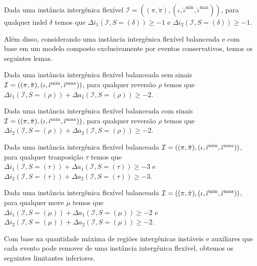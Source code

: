 \begin{lemma}\label{lemma:HQJMMZCU}
Dada uma instância intergênica flexível $\mathcal{I} = ((\pi,\breve\pi),(\iota,\breve\iota^{\min},\breve\iota^{\max}))$, para qualquer indel $\delta$ temos que $\Delta i_1(\mathcal{I}, S = (\delta)) \ge -1$ e $\Delta i_2(\mathcal{I}, S = (\delta)) \ge -1$.
\end{lemma}

Além disso, considerando uma instância intergênica flexível balanceada e com base em um modelo composto exclusivamente por eventos conservativos, temos os seguintes lemas.

\begin{lemma}\label{lemma:IERALSKC}
Dada uma instância intergênica flexível balanceada sem sinais $\mathcal{I} = ((\pi,\breve\pi),\break(\iota,\breve\iota^{\min},\breve\iota^{\max}))$, para qualquer reversão $\rho$ temos que $\Delta i_1(\mathcal{I}, S = (\rho)) + \Delta a_1(\mathcal{I}, S = (\rho)) \ge -2$.
\end{lemma}

\begin{lemma}\label{lemma:LMCJCLQU}
Dada uma instância intergênica flexível balanceada com sinais $\mathcal{I} = ((\pi,\breve\pi),\break(\iota,\breve\iota^{\min},\breve\iota^{\max}))$, para qualquer reversão $\rho$ temos que $\Delta i_2(\mathcal{I}, S = (\rho)) + \Delta a_2(\mathcal{I}, S = (\rho)) \ge -2$.
\end{lemma}

\begin{lemma}\label{lemma:FOXQSODF}
Dada uma instância intergênica flexível balanceada $\mathcal{I} = ((\pi,\breve\pi),\break(\iota,\breve\iota^{\min},\breve\iota^{\max}))$, para qualquer tranposição $\tau$ temos que $\Delta i_1(\mathcal{I}, S = (\tau)) + \Delta a_1(\mathcal{I}, S = (\tau)) \ge -3$ e $\Delta i_2(\mathcal{I}, S = (\tau)) + \Delta a_2(\mathcal{I}, S = (\tau)) \ge -3$.
\end{lemma}

\begin{lemma}\label{lemma:AXMNYRLB}
Dada uma instância intergênica flexível balanceada $\mathcal{I} = ((\pi,\breve\pi),\break(\iota,\breve\iota^{\min},\breve\iota^{\max}))$, para qualquer move $\mu$ temos que $\Delta i_1(\mathcal{I}, S = (\mu)) + \Delta a_1(\mathcal{I}, S = (\mu)) \ge -2$ e $\Delta i_2(\mathcal{I}, S = (\mu)) + \Delta a_2(\mathcal{I}, S = (\mu)) \ge -2$.
\end{lemma}

Com base na quantidade máxima de regiões intergênicas instáveis e auxiliares que cada evento pode remover de uma instância intergênica flexível, obtemos os seguintes limitantes inferiores.

